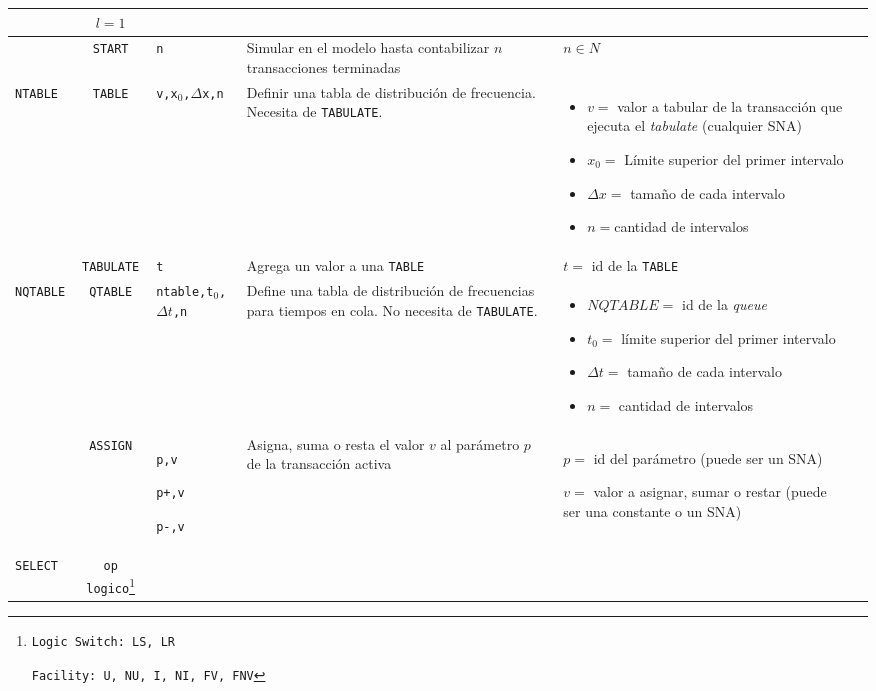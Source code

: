 \documentclass[12pt, a4paper, twoside]{paquetes-apunte/apunte}
\providecommand{\tabularnewline}{\\}
\begin{document}
\begin{longtable}{|lc>{\raggedright}p{3cm}|>{\raggedright}p{5cm}|>{\raggedright}p{7cm}|>{\raggedright}p{4cm}|}
 & $l=1$\tabularnewline
\hline 
 & \texttt{START} & \texttt{n} & Simular en el modelo hasta contabilizar $n$ transacciones terminadas & $n\in N$ & \tabularnewline
\hline 
\texttt{NTABLE} & \texttt{TABLE} & \texttt{v,x$_{0}$,$\Delta$x,n} & Definir una tabla de distribución de frecuencia. Necesita de \texttt{TABULATE}. & \begin{itemize}
\item $v=$ valor a tabular de la transacción que ejecuta el \emph{tabulate}
(cualquier SNA)
\item $x_{0}=$ Límite superior del primer intervalo
\item $\Delta x=$ tamaño de cada intervalo
\item $n=$cantidad de intervalos\end{itemize}
 & \tabularnewline
\hline 
 & \texttt{TABULATE} & \texttt{t} & Agrega un valor a una \texttt{TABLE} & $t=$ id de la \texttt{TABLE} & \tabularnewline
\hline 
\texttt{NQTABLE} & \texttt{QTABLE} & \texttt{ntable,t$_{0}$,$\Delta t$,n} & Define una tabla de distribución de frecuencias para tiempos en cola.
No necesita de \texttt{TABULATE}. & \begin{itemize}
\item $NQTABLE=$ id de la\emph{ queue}
\item $t_{0}=$ límite superior del primer intervalo
\item $\Delta t=$ tamaño de cada intervalo
\item $n=$ cantidad de intervalos\end{itemize}
 & \tabularnewline
\hline 
 & \texttt{ASSIGN} & \texttt{p,v}

\texttt{p+,v}

\texttt{p-,v} & Asigna, suma o resta el valor $v$ al parámetro $p$ de la transacción
activa & $p=$ id del parámetro (puede ser un SNA)

$v=$ valor a asignar, sumar o restar (puede ser una constante o un
SNA) & \tabularnewline
\hline 
\texttt{SELECT} & \texttt{op logico}\footnote{\texttt{Logic Switch: LS, LR}

\texttt{Facility: U, NU, I, NI, FV, FNV}

}
\end{longtable}
\end{document}
